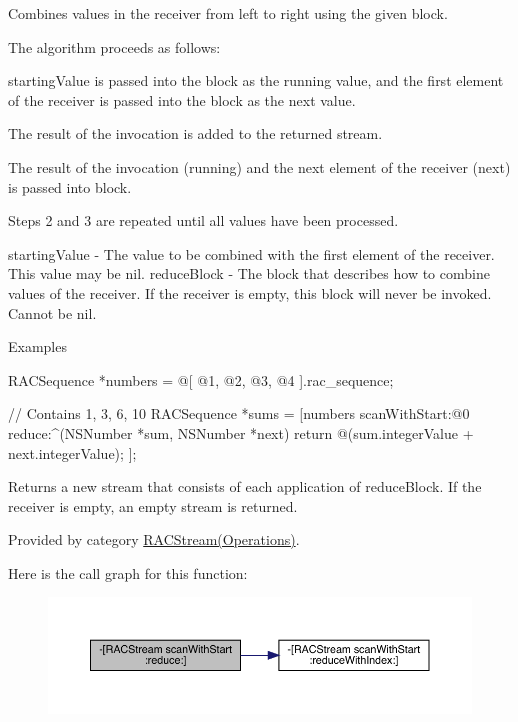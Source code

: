 Combines values in the receiver from left to right using the given block.

The algorithm proceeds as follows\+:


\begin{DoxyEnumerate}
\item {\ttfamily starting\+Value} is passed into the block as the {\ttfamily running} value, and the first element of the receiver is passed into the block as the {\ttfamily next} value.
\item The result of the invocation is added to the returned stream.
\item The result of the invocation ({\ttfamily running}) and the next element of the receiver ({\ttfamily next}) is passed into {\ttfamily block}.
\item Steps 2 and 3 are repeated until all values have been processed.
\end{DoxyEnumerate}

starting\+Value -\/ The value to be combined with the first element of the receiver. This value may be {\ttfamily nil}. reduce\+Block -\/ The block that describes how to combine values of the receiver. If the receiver is empty, this block will never be invoked. Cannot be nil.

Examples \begin{DoxyVerb} RACSequence *numbers = @[ @1, @2, @3, @4 ].rac_sequence;

 // Contains 1, 3, 6, 10
 RACSequence *sums = [numbers scanWithStart:@0 reduce:^(NSNumber *sum, NSNumber *next) {
     return @(sum.integerValue + next.integerValue);
 }];
\end{DoxyVerb}


Returns a new stream that consists of each application of {\ttfamily reduce\+Block}. If the receiver is empty, an empty stream is returned. 

Provided by category \mbox{\hyperlink{category_r_a_c_stream_07_operations_08_aa86990e9bc4cbc3dff2815f56b907b41}{R\+A\+C\+Stream(\+Operations)}}.

Here is the call graph for this function\+:\nopagebreak
\begin{figure}[H]
\begin{center}
\leavevmode
\includegraphics[width=350pt]{interface_r_a_c_stream_aa86990e9bc4cbc3dff2815f56b907b41_cgraph}
\end{center}
\end{figure}
\mbox{\label{interface_r_a_c_stream_aa86990e9bc4cbc3dff2815f56b907b41}} 
